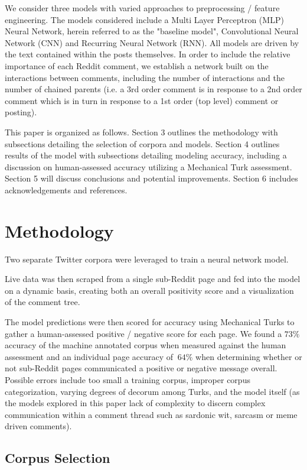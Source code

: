 \documentclass[11pt]{article}
\begin{document}
We consider three models with varied approaches to preprocessing / feature engineering. The models considered include a Multi Layer Perceptron (MLP) Neural Network, 
herein referred to as the "baseline model", Convolutional Neural Network (CNN) and 
Recurring Neural Network (RNN). All models are driven by the text contained 
within the posts themselves. In order to include the relative importance of each Reddit comment, we establish a network built on the interactions between comments, including the number of interactions and the number of chained parents 
(i.e. a 3rd order comment is in response to a 2nd order comment which is in 
turn in response to a 1st order (top level) comment or posting).

This paper is organized as follows. Section 3 outlines the methodology with 
subsections detailing the selection of corpora and models. Section 4 outlines results
of the model with subsections detailing modeling accuracy, including a discussion on human-assessed accuracy utilizing a Mechanical Turk assessment. Section 5 will discuss conclusions 
and potential improvements. Section 6 includes acknowledgements and references.

\section{Methodology}

Two separate Twitter corpora were leveraged to train a neural network model. 

Live data was then scraped from a single sub-Reddit page and fed into the model on a 
dynamic basis, creating both an overall positivity score and a visualization of the comment tree.

The model predictions were then scored for accuracy using Mechanical Turks to gather a human-assessed positive / negative score for each page. We found a \(73\%\) accuracy of the 
machine annotated corpus when measured against the human assessment and an 
individual page accuracy of \(~64\%\) when determining whether or not sub-Reddit 
pages communicated a positive or negative message overall. Possible 
errors include too small a training corpus, improper corpus categorization, 
varying degrees of decorum among Turks, and the model itself (as the models explored 
in this paper lack of complexity to discern complex communication within a comment thread such as sardonic wit, 
sarcasm or meme driven comments).

\subsection{Corpus Selection}
\end{document}
